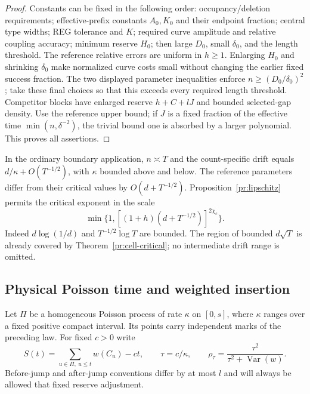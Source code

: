 \begin{proof}
Constants can be fixed in the following order: occupancy/deletion
requirements; effective-prefix constants $A_0,K_0$ and their endpoint
fraction; central type widths; REG tolerance and $K$; required curve
amplitude and relative coupling accuracy; minimum reserve $H_0$;
then large $D_0$, small $\delta_0$, and the length threshold. The
reference relative errors are uniform in $h\ge1$. Enlarging $H_0$ and
shrinking $\delta_0$ make normalized curve costs small without changing
the earlier fixed success fraction. The two displayed parameter
inequalities enforce $n\ge(D_0/\delta_0)^2$; take these final choices
so that this exceeds every required length threshold. Competitor blocks
have enlarged
reserve $h+C+lJ$ and bounded selected-gap density. Use the reference
upper bound; if $J$ is a fixed fraction of the effective time
$\min(n,\delta^{-2})$, the trivial bound one is absorbed by a larger
polynomial. This proves all assertions.
\end{proof}

In the ordinary boundary application, $n\asymp T$ and the count-specific
drift equals $d/\kappa+O(T^{-1/2})$, with $\kappa$ bounded above and below.
The reference parameters differ from their critical values by
$O(d+T^{-1/2})$. Proposition~\ref{pr:lipschitz} permits the critical
exponent in the scale
\[
 \min\{1,[(1+h)(d+T^{-1/2})]^{2\chi_c}\}.
\]
Indeed $d\log(1/d)$ and $T^{-1/2}\log T$ are bounded. The region of
bounded $d\sqrt T$ is already covered by
Theorem~\ref{pr:cell-critical}; no intermediate drift range is omitted.

\subsection{Physical Poisson time and weighted insertion}

Let $\Pi$ be a homogeneous Poisson process of rate $\kappa$ on $[0,s]$,
where $\kappa$ ranges over a fixed positive compact interval. Its points
carry independent marks of the preceding law. For fixed $c>0$ write
\[
 S(t)=\sum_{u\in\Pi,\ u\le t}w(C_u)-ct,
 \qquad \tau=c/\kappa,\qquad
 \rho_\tau=\frac{\tau^2}{\tau^2+\operatorname{Var}(w)}.
\]
Before-jump and after-jump conventions differ by at most $l$ and will
always be allowed that fixed reserve adjustment.

